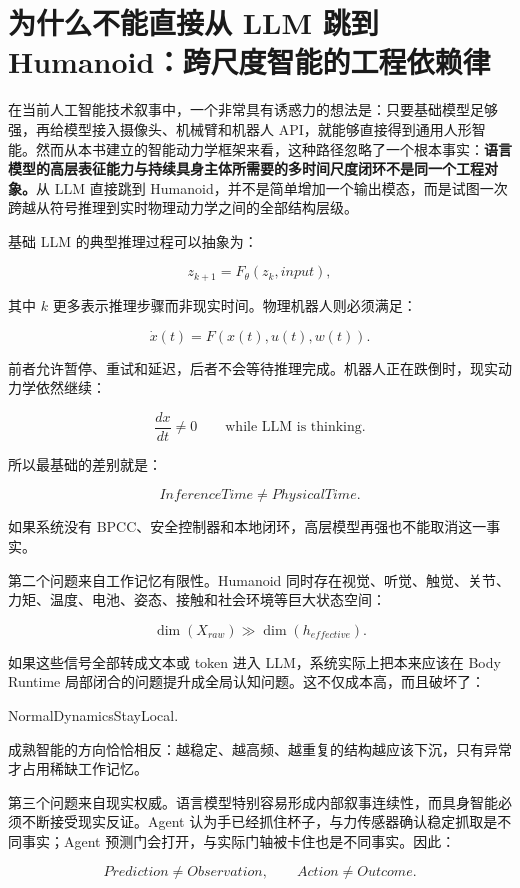 \section{为什么不能直接从 LLM 跳到 Humanoid：跨尺度智能的工程依赖律}

在当前人工智能技术叙事中，一个非常具有诱惑力的想法是：只要基础模型足够强，再给模型接入摄像头、机械臂和机器人 API，就能够直接得到通用人形智能。然而从本书建立的智能动力学框架来看，这种路径忽略了一个根本事实：\textbf{语言模型的高层表征能力与持续具身主体所需要的多时间尺度闭环不是同一个工程对象。}从 LLM 直接跳到 Humanoid，并不是简单增加一个输出模态，而是试图一次跨越从符号推理到实时物理动力学之间的全部结构层级。

基础 LLM 的典型推理过程可以抽象为：

$$
z_{k+1}=F_{\theta}(z_k,input),
$$

其中 $k$ 更多表示推理步骤而非现实时间。物理机器人则必须满足：

$$
\dot x(t)=F(x(t),u(t),w(t)).
$$

前者允许暂停、重试和延迟，后者不会等待推理完成。机器人正在跌倒时，现实动力学依然继续：

$$
\frac{dx}{dt}\neq0
\qquad
\text{while LLM is thinking}.
$$

所以最基础的差别就是：

$$
\boxed{
InferenceTime\neq PhysicalTime.
}
$$

如果系统没有 BPCC、安全控制器和本地闭环，高层模型再强也不能取消这一事实。

第二个问题来自工作记忆有限性。Humanoid 同时存在视觉、听觉、触觉、关节、力矩、温度、电池、姿态、接触和社会环境等巨大状态空间：

$$
\dim(X_{raw})\gg\dim(h_{effective}).
$$

如果这些信号全部转成文本或 token 进入 LLM，系统实际上把本来应该在 Body Runtime 局部闭合的问题提升成全局认知问题。这不仅成本高，而且破坏了：

\begin{statementbox}
NormalDynamicsStayLocal.
\end{statementbox}

成熟智能的方向恰恰相反：越稳定、越高频、越重复的结构越应该下沉，只有异常才占用稀缺工作记忆。

第三个问题来自现实权威。语言模型特别容易形成内部叙事连续性，而具身智能必须不断接受现实反证。Agent 认为手已经抓住杯子，与力传感器确认稳定抓取是不同事实；Agent 预测门会打开，与实际门轴被卡住也是不同事实。因此：

$$
\boxed{
Prediction
\neq
Observation,
\qquad
Action
\neq
Outcome.
}
$$

